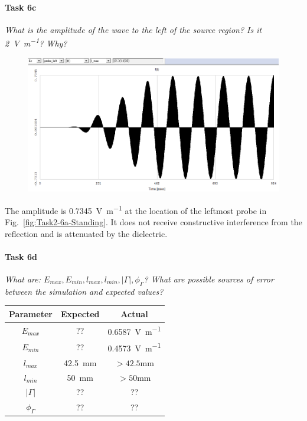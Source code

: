 \paragraph{Task 6c} \textit{What is the amplitude of the wave to the left of the source region? Is it \SI{2}{\volt\per\meter}? Why?}
\begin{figure}[tbph]
	\centering
	\includegraphics[width=0.6\linewidth]{graphics/Task2-6c-Amplitude_left}
\end{figure}
The amplitude is \SI{0.7345}{\volt\per\meter} at the location of the leftmost probe in Fig.~\ref{fig:Task2-6a-Standing}.
It does not receive constructive interference from the reflection and is attenuated by the dielectric.

\paragraph{Task 6d} \textit{What are: $E_{max}, E_{min}, l_{max}, l_{min}, \left|\Gamma\right|, \phi_\Gamma$? What are possible sources of error between the simulation and expected values?}
\begin{table}[htpb]
	\centering
	\begin{tabular}{@{}ccc@{}}
		\toprule
		Parameter             & Expected                   & Actual \\ 
		\midrule
		$E_{max}$             & ?? & \SI{0.6587}{\volt\per\meter} \\
		$E_{min}$             & ?? & \SI{0.4573}{\volt\per\meter} \\
		$l_{max}$             & \SI{42.5}{\milli\meter}    & $>42.5$\si{\milli\meter} \\
		$l_{min}$             & \SI{50}{\milli\meter}      & $>50$\si{\milli\meter} \\
		$\left|\Gamma\right|$ & ?? & ?? \\
		$\phi_\Gamma$         & ?? & ?? \\
		\bottomrule
	\end{tabular}
\end{table}
